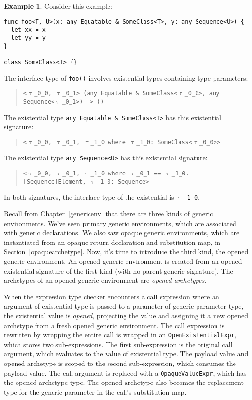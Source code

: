 \documentclass[a4paper,headsepline,bibliography=totoc,toc=flat,fleqn,twoside=semi]{scrbook}
\theoremstyle{definition}
\theoremstyle{definition}
\newtheorem{example}{Example}[chapter]
\theoremstyle{definition}
\newcommand{\ttgp}[2]{\texttt{$\uptau$\_#1\_#2}}
\begin{document}
\begin{example}
Consider this example:
\begin{Verbatim}
func foo<T, U>(x: any Equatable & SomeClass<T>, y: any Sequence<U>) {
  let xx = x
  let yy = y
}

class SomeClass<T> {}
\end{Verbatim}
The interface type of \texttt{foo()} involves existential types containing type parameters:
\begin{quote}
\texttt{<\ttgp{0}{0}, \ttgp{0}{1}> (any Equatable \& SomeClass<\ttgp{0}{0}>, any Sequence<\ttgp{0}{1}>) -> ()}
\end{quote}
The existential type \texttt{any Equatable \& SomeClass<T>} has this existential signature:
\begin{quote}
\texttt{<\ttgp{0}{0}, \ttgp{0}{1}, \ttgp{1}{0} where \ttgp{1}{0}:\ SomeClass<\ttgp{0}{0}>>}
\end{quote}
The existential type \texttt{any Sequence<U>} has this existential signature:
\begin{quote}
\texttt{<\ttgp{0}{0}, \ttgp{0}{1}, \ttgp{1}{0} where \ttgp{0}{1} == \ttgp{1}{0}.[Sequence]Element, \ttgp{1}{0}:\ Sequence>}
\end{quote}
In both signatures, the interface type of the existential is \texttt{\ttgp{1}{0}}.
\end{example}
Recall from Chapter~\ref{genericenv} that there are three kinds of generic environments. We've seen primary generic environments, which are associated with generic declarations. We also saw opaque generic environments, which are instantiated from an opaque return declaration and substitution map, in Section~\ref{opaquearchetype}. Now, it's time to introduce the third kind, the opened generic environment. An opened generic environment is created from an opened existential signature of the first kind (with no parent generic signature). The archetypes of an opened generic environment are \emph{opened archetypes}.

When the expression type checker encounters a call expression where an argument of existential type is passed to a parameter of generic parameter type, the existential value is \emph{opened}, projecting the value and assigning it a new opened archetype from a fresh opened generic environment. The call expression is rewritten by wrapping the entire call is wrapped in an \texttt{OpenExistentialExpr}, which stores two sub-expressions. The first sub-expression is the original call argument, which evaluates to the value of existential type. The payload value and opened archetype is scoped to the second sub-expression, which consumes the payload value. The call argument is replaced with a \texttt{OpaqueValueExpr}, which has the opened archetype type. The opened archetype also becomes the replacement type for the generic parameter in the call's substitution map.
\end{document}
